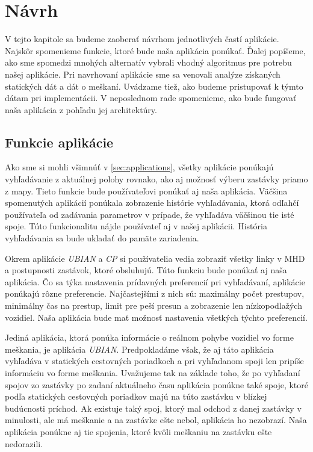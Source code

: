 \chapter{Návrh}
\label{kap:nav}
V tejto kapitole sa budeme zaoberať návrhom jednotlivých častí aplikácie. Najskôr spomenieme funkcie, ktoré bude naša aplikácia ponúkať. Ďalej popíšeme, ako sme spomedzi mnohých alternatív vybrali vhodný algoritmus pre potrebu našej aplikácie. Pri navrhovaní aplikácie sme sa venovali analýze získaných statických dát a dát o meškaní. Uvádzame tiež, ako budeme pristupovať k týmto dátam pri implementácii. V neposlednom rade spomenieme, ako bude fungovať naša aplikácia z pohľadu jej architektúry.

\section{Funkcie aplikácie}
Ako sme si mohli všimnúť v \ref{sec:applications}, všetky aplikácie ponúkajú vyhľadávanie z aktuálnej polohy rovnako, ako aj možnosť výberu zastávky priamo z mapy. Tieto funkcie bude používateľovi ponúkať aj naša aplikácia. Väčšina spomenutých aplikácií ponúkala zobrazenie histórie vyhľadávania, ktorá odľahčí používateľa od zadávania parametrov v prípade, že vyhľadáva väčšinou tie isté spoje. Túto funkcionalitu nájde používateľ aj v našej aplikácii. História vyhľadávania sa bude ukladať do pamäte zariadenia. 

Okrem aplikácie \textit{UBIAN} a \textit{CP} si používatelia vedia zobraziť všetky linky v MHD a postupnosti zastávok, ktoré obsluhujú. Túto funkciu bude ponúkať aj naša aplikácia. Čo sa týka nastavenia prídavných preferencií pri vyhľadávaní, aplikácie ponúkajú rôzne preferencie. Najčastejšími z nich sú: maximálny počet prestupov, minimálny čas na prestup, limit pre peší presun a zobrazenie len nízkopodlažých vozidiel. Naša aplikácia bude mať možnosť nastavenia všetkých týchto preferencií.

Jediná aplikácia, ktorá ponúka informácie o reálnom pohybe vozidiel vo forme meškania, je aplikácia \textit{UBIAN}. Predpokladáme však, že aj táto aplikácia vyhľadáva v statických cestovných poriadkoch a pri vyhľadanom spoji len pripíše informáciu vo forme meškania. Uvažujeme tak na základe toho, že po vyhľadaní spojov zo zastávky po zadaní aktuálneho času aplikácia ponúkne také spoje, ktoré podľa statických cestovných poriadkov majú na túto zastávku v blízkej budúcnosti príchod. Ak existuje taký spoj, ktorý mal odchod z danej zastávky v minulosti, ale má meškanie a na zastávke ešte nebol, aplikácia ho nezobrazí. Naša aplikácia ponúkne aj tie spojenia, ktoré kvôli meškaniu na zastávku ešte nedorazili.

